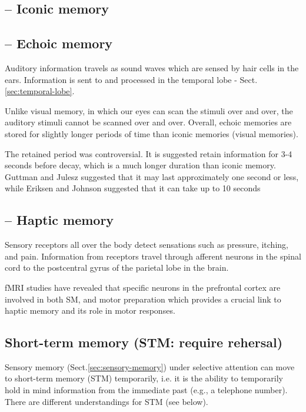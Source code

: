 % 
\subsection{-- Iconic memory}
\label{sec:iconic-memory-sensory}

\subsection{-- Echoic memory}
\label{sec:echoic-memory-sensory}

Auditory information travels as sound waves which are sensed by hair cells in
the ears. Information is sent to and processed in the temporal lobe -
Sect.\ref{sec:temporal-lobe}.

Unlike visual memory, in which our eyes can scan the stimuli over and over, the
auditory stimuli cannot be scanned over and over. Overall, echoic memories are
stored for slightly longer periods of time than iconic
memories (visual memories).

The retained period was controversial.
It is suggested retain information for 3-4 seconds before decay, which is a much
longer duration than iconic memory. Guttman and Julesz suggested that it may
last approximately one second or less, while Eriksen and Johnson suggested that
it can take up to 10 seconds

\subsection{-- Haptic memory}
\label{sec:haptic-memory-sensory}

Sensory receptors all over the body detect sensations such as pressure, itching,
and pain. Information from receptors travel through afferent neurons in the
spinal cord to the postcentral gyrus of the parietal lobe in the brain. 

fMRI studies have revealed that specific neurons in the prefrontal cortex are
involved in both SM, and motor preparation which provides a crucial link to
haptic memory and its role in motor responses.


\subsection{Short-term memory (STM: require rehersal)}
\label{sec:short-term_memory}

Sensory memory (Sect.\ref{sec:sensory-memory}) under
selective attention can move to short-term memory (STM) temporarily, i.e. it is
the ability to temporarily hold in mind information from the immediate past
(e.g., a telephone number). There are different understandings for STM (see
below).

